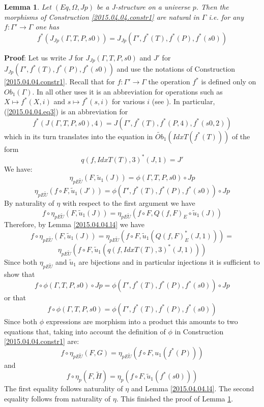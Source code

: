 \documentclass[12pt]{article}
\newenvironment{eq}{\begin{equation}}{\end{equation}}
\newenvironment{myproof}{{\bf Proof}:}{\vskip 5mm }
\newtheorem{lemma}[proposition]{Lemma}
\newcommand{\llabel}[1]{\label{#1}}
\newcommand{\sr}{\rightarrow}
\newcommand{\wt}{\widetilde}
\begin{document}
%
\begin{lemma}
\llabel{2015.04.04.l1}
Let $(Eq,\Omega,Jp)$ be a J-structure on a universe $p$. Then the morphisms of Construction \ref{2015.04.04.constr1} are natural in $\Gamma$ i.e. for any $f:\Gamma'\sr \Gamma$ one has
%
\begin{eq}\llabel{2015.04.04.eq3}
f^*(J_{Jp}(\Gamma,T,P,s0))=J_{Jp}(\Gamma',f^*(T),f^*(P),f^*(s0))
\end{eq}
%
\end{lemma}
%
\begin{myproof}
Let us write $J$ for $J_{Jp}(\Gamma,T,P,s0)$ and $J'$ for $J_{Jp}(\Gamma',f^*(T),f^*(P),f^*(s0))$ and use the notations of Construction \ref{2015.04.04.constr1}. Recall that for $f:\Gamma'\sr \Gamma$ the operation $f^*$ is defined only on $Ob_1(\Gamma)$. In all other uses it is an abbreviation for operations such as $X\mapsto f^*(X,i)$ and $s\mapsto f^*(s,i)$ for various $i$ (see \cite{Csubsystems}). In particular, (\ref{2015.04.04.eq3}) is an abbreviation for 
%
$$f^*(J(\Gamma,T,P,s0),4)=J(\Gamma',f^*(T),f^*(P,4),f^*(s0,2))$$
%
which in its turn translates into the equation in $\wt{Ob}_1(IdxT(f^*(T)))$ of the form
%
$$q(f,IdxT(T),3)^*(J,1)=J'$$
%
We have:
%
$$\eta_{pE\wt{U}}(F,\wt{u}_1(J))=\phi(\Gamma,T,P,s0)\circ Jp$$
$$\eta_{pE\wt{U}}(f\circ F, \wt{u}_1(J'))=\phi(\Gamma',f^*(T),f^*(P),f^*(s0))\circ Jp$$
%
By naturality of $\eta$ with respect to the first argument we have
%
$$f\circ \eta_{pE\wt{U}}(F,\wt{u}_1(J))=\eta_{pE\wt{U}}(f\circ F, Q(f,F)_{E}\circ \wt{u}_1(J))$$
%
Therefore, by Lemma \ref{2015.04.04.l4} we have
%
$$f\circ \eta_{pE\wt{U}}(F,\wt{u}_1(J))=\eta_{pE\wt{U}}(f\circ F, \wt{u}_1(Q(f,F)_{E}^*(J,1)))=$$
$$\eta_{pE\wt{U}}(f\circ F, \wt{u}_1(q(f,IdxT(T),3)^*(J,1)))$$
%
Since both $\eta_{pE\wt{U}}$ and $\wt{u}_1$ are bijections and in particular injections it is sufficient to show that
%
$$f\circ \phi(\Gamma,T,P,s0)\circ Jp = \phi(\Gamma',f^*(T),f^*(P),f^*(s0))\circ Jp$$
%
or that
%
$$f\circ \phi(\Gamma,T,P,s0)=\phi(\Gamma',f^*(T),f^*(P),f^*(s0))$$
%
Since both $\phi$ expressions are morphism into a product this amounts to two equations that, taking into account the definition of $\phi$ in Construction \ref{2015.04.04.constr1} are:
%
$$f\circ \eta_{pE\wt{U}}(F,G)=\eta_{pE\wt{U}}(f\circ F, u_1(f^*(P)))$$
%
and
%
$$f\circ \eta_p(F,\wt{H})=\eta_p(f\circ F, \wt{u}_1(f^*(s0)))$$
%
The first equality follows naturality of $\eta$ and Lemma \ref{2015.04.04.l4}. The second equality follows from naturality of $\eta$. This finished the proof of Lemma \ref{2015.04.04.l1}.
\end{myproof}
\end{document}
